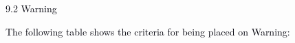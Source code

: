 \documentclass[12pt]{article}
\begin{document}
\vspace{\baselineskip}
\begin{adjustwidth}{0.07in}{0.0in}
\textcolor[HTML]{00000A}{9.2 Warning}\par

\end{adjustwidth}


\vspace{\baselineskip}
\begin{adjustwidth}{0.07in}{0.0in}
{\fontsize{10pt}{12.0pt}\selectfont \textcolor[HTML]{00000A}{The following table shows the criteria for being placed on Warning:}\par}\par

\end{adjustwidth}


\vspace{\baselineskip}


\end{document}
